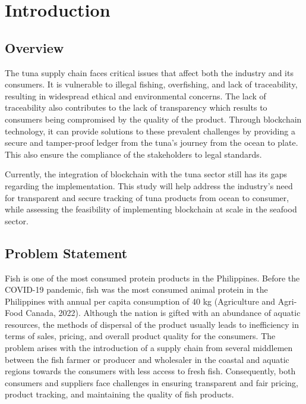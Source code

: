 \chapter{Introduction}
\label{sec:researchdesc}    %

\section{Overview}
\label{sec:overview}

The tuna supply chain faces critical issues that affect both the industry and its consumers. It is vulnerable to illegal fishing, overfishing, and lack of traceability, resulting in widespread ethical and environmental concerns. The lack of traceability also contributes to the lack of transparency which results to consumers being compromised by the quality of the product. Through blockchain technology, it can provide solutions to these prevalent challenges by providing a secure and tamper-proof ledger from the tuna's journey from the ocean to plate. This also ensure the compliance of the stakeholders to legal standards.

\noindent Currently, the integration of blockchain with the tuna sector still has its gaps regarding the implementation. This study will help address the industry’s need for transparent and secure tracking of tuna products from ocean to consumer, while assessing the feasibility of implementing blockchain at scale in the seafood sector.


\section{Problem Statement}

Fish is one of the most consumed protein products in the Philippines. Before the COVID-19 pandemic, fish was the most consumed animal protein in the Philippines with annual per capita consumption of 40 kg (Agriculture and Agri-Food Canada, 2022). Although the nation is gifted with an abundance of aquatic resources, the methods of dispersal of the product usually leads to inefficiency in terms of sales, pricing, and overall product quality for the consumers. The problem arises with the introduction of a supply chain from several middlemen between the fish farmer or producer and wholesaler in the coastal and aquatic regions towards the consumers with less access to fresh fish. Consequently, both consumers and suppliers face challenges in ensuring transparent and fair pricing, product tracking, and maintaining the quality of fish products.



